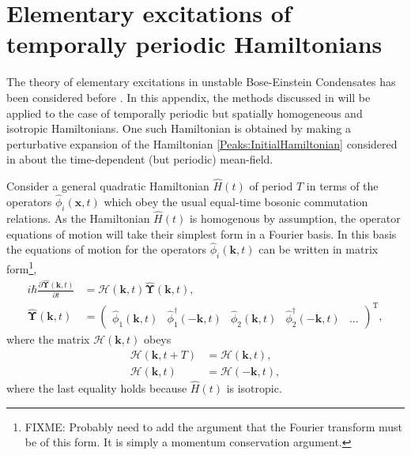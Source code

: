\chapter{Elementary excitations of temporally periodic Hamiltonians}
\label{PeaksAppendix}
\graphicspath{{Figures/PeaksAppendix/}{Figures/Common/}}

The theory of elementary excitations in unstable Bose-Einstein Condensates has been considered before \citep{Leonhardt:2003}. In this appendix, the methods discussed in \citep{Leonhardt:2003} will be applied to the case of temporally periodic but spatially homogeneous and isotropic Hamiltonians. One such Hamiltonian is obtained by making a perturbative expansion of the Hamiltonian \eqref{Peaks:InitialHamiltonian} considered in  about the time-dependent (but periodic) mean-field.

Consider a general quadratic Hamiltonian $\hat{H}(t)$ of period $T$ in terms of the operators $\hat{\phi}_i(\bm{x}, t)$ which obey the usual equal-time bosonic commutation relations. As the Hamiltonian $\hat{H}(t)$ is homogenous by assumption, the operator equations of motion will take their simplest form in a Fourier basis. In this basis the equations of motion for the operators $\hat{\phi}_i(\bm{k}, t)$ can be written in matrix form\footnote{FIXME: Probably need to add the argument that the Fourier transform must be of this form. It is simply a momentum conservation argument.},
\begin{subequations}
    \label{PeaksAppendix:MatrixOperatorEvolution}
    \begin{align}
        i \hbar \frac{\partial \hat{\bm{\Upsilon}}(\bm{k}, t)}{\partial t} &= \mathcal{H}(\bm{k}, t) \hat{\bm{\Upsilon}}(\bm{k}, t),\\
        \hat{\bm{\Upsilon}}(\bm{k}, t) &= 
        \begin{pmatrix}
            \hat{\phi}_1(\bm{k}, t) &
            \hat{\phi}_1^\dagger(-\bm{k}, t) &
            \hat{\phi}_2(\bm{k}, t) &
            \hat{\phi}_2^\dagger(-\bm{k}, t) &
            \dots
        \end{pmatrix}^\text{T},
    \end{align}
\end{subequations}
where the matrix $\mathcal{H}(\bm{k}, t)$ obeys
\begin{align}
        \mathcal{H}(\bm{k}, t+T) &= \mathcal{H}(\bm{k}, t),\\
        \mathcal{H}(\bm{k}, t) &= \mathcal{H}(-\bm{k}, t), \label{PeaksAppendix:HReflectionSymmetry}
\end{align}
where the last equality holds because $\hat{H}(t)$ is isotropic.

